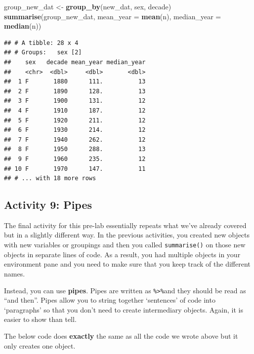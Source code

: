 \documentclass[]{book}
\newenvironment{Shaded}{\begin{snugshade}}{\end{snugshade}}
\newcommand{\DataTypeTok}[1]{\textcolor[rgb]{0.13,0.29,0.53}{#1}}
\newcommand{\KeywordTok}[1]{\textcolor[rgb]{0.13,0.29,0.53}{\textbf{#1}}}
\newcommand{\NormalTok}[1]{#1}
\newcommand{\StringTok}[1]{\textcolor[rgb]{0.31,0.60,0.02}{#1}}
\begin{document}
\begin{Shaded}
\begin{Highlighting}[]
\NormalTok{group_new_dat <-}\StringTok{ }\KeywordTok{group_by}\NormalTok{(new_dat, sex, decade)}
\KeywordTok{summarise}\NormalTok{(group_new_dat,}
          \DataTypeTok{mean_year =} \KeywordTok{mean}\NormalTok{(n),}
          \DataTypeTok{median_year =} \KeywordTok{median}\NormalTok{(n))}
\end{Highlighting}
\end{Shaded}

\begin{verbatim}
## # A tibble: 28 x 4
## # Groups:   sex [2]
##    sex   decade mean_year median_year
##    <chr>  <dbl>     <dbl>       <dbl>
##  1 F       1880      111.          13
##  2 F       1890      128.          13
##  3 F       1900      131.          12
##  4 F       1910      187.          12
##  5 F       1920      211.          12
##  6 F       1930      214.          12
##  7 F       1940      262.          12
##  8 F       1950      288.          13
##  9 F       1960      235.          12
## 10 F       1970      147.          11
## # ... with 18 more rows
\end{verbatim}

\hypertarget{activity-9-pipes}{%
\subsection{Activity 9: Pipes}\label{activity-9-pipes}}

The final activity for this pre-lab essentially repeats what we've already covered but in a slightly different way. In the previous activities, you created new objects with new variables or groupings and then you called \texttt{summarise()} on those new objects in separate lines of code. As a result, you had multiple objects in your environment pane and you need to make sure that you keep track of the different names.

Instead, you can use \textbf{pipes}. Pipes are written as \texttt{\%\textgreater{}\%}and they should be read as ``and then''. Pipes allow you to string together `sentences' of code into `paragraphs' so that you don't need to create intermediary objects. Again, it is easier to show than tell.

The below code does \textbf{exactly} the same as all the code we wrote above but it only creates one object.
\end{document}
